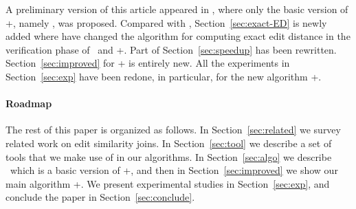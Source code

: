 


A preliminary version of this article appeared in \cite{ZZ17}, where only the basic version of \ebdjoin+, namely \ebdjoin, was proposed.   
Compared with \cite{ZZ17}, Section~\ref{sec:exact-ED} is newly added where have changed the algorithm for computing exact edit distance in the verification phase of \ebdjoin\ and \ebdjoin+. Part of Section~\ref{sec:speedup} has been rewritten. 
Section~\ref{sec:improved} for \ebdjoin+ is entirely new.  All the experiments in Section~\ref{sec:exp} have been redone, in particular, for the new algorithm \ebdjoin+.  


\paragraph{Roadmap} The rest of this paper is organized as follows.  In Section~\ref{sec:related} we survey related work on edit similarity joins.  In Section~\ref{sec:tool} we describe a set of tools that we make use of in our algorithms.
In Section~\ref{sec:algo} we describe \ebdjoin\ which is a basic version of \ebdjoin+, and then in Section~\ref{sec:improved} we show our main algorithm \ebdjoin+.  We present experimental studies in Section~\ref{sec:exp}, and conclude the paper in Section~\ref{sec:conclude}.   




 


